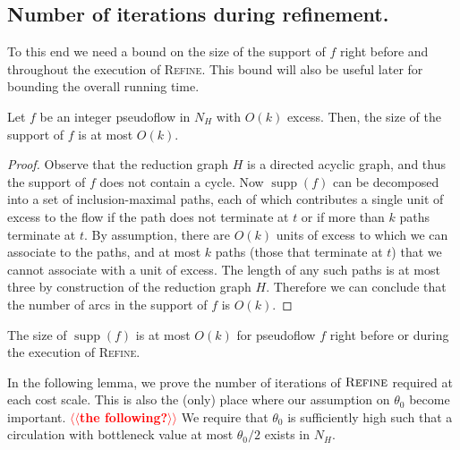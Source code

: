 \documentclass[a4paper,UKenglish]{socg-lipics-v2018}
\makeatletter
\def\etal{\emph{et~al.}}
\def\etal{\textit{et~al.}}
\def\supp{\operatorname{supp}}
\theoremstyle{plain}
\numberwithin{figure}{section}
\def\n@te#1{\textsf{\boldmath \textbf{$\langle\!\langle$#1$\rangle\!\rangle$}}\leavevmode}
\def\note#1{\textcolor{red}{\n@te{#1}}}
\makeatother
\begin{document}
\begin{toappendix}
\subsection{Number of iterations during refinement.}
\label{SSA:num-iterations-refine}


To this end we need a bound on the size of the support of $f$ right before and throughout the execution of \textsc{Refine}.
This bound will also be useful later for bounding the overall running time.

\begin{lemmarep}
\label{lemma:reduction_count}
Let $f$ be an integer pseudoflow in $N_H$ with $O(k)$ excess.
Then, the size of the support of $f$ is at most $O(k)$.
\end{lemmarep}

\begin{proof}
Observe that the reduction graph $H$ is a directed acyclic graph, and thus the support of $f$ does not contain a cycle.
Now $\supp(f)$ can be decomposed into a set of inclusion-maximal paths,
each of which contributes a single unit of excess to the flow if the path does not terminate at $t$ or if more than $k$ paths terminate at $t$.
By assumption, there are $O(k)$ units of excess to which we can associate to the paths, and at most $k$ paths (those that terminate at $t$) that we cannot associate with a unit of excess.
The length of any such paths is at most  three by construction of the reduction graph $H$.
Therefore we can conclude that the number of arcs in the support of $f$ is $O(k)$.
\end{proof}

\begin{corollary}
\label{corollary:support_size_during}
The size of $\supp(f)$ is at most $O(k)$ for pseudoflow $f$ right before or during the execution of \textsc{Refine}.
\end{corollary}

\end{toappendix}

In the following lemma, we prove the number of iterations of $\textsc{Refine}$
required at each cost scale.
This is also the (only) place where our assumption on $\theta_0$
become important. \note{the following?}
We require that $\theta_0$ is sufficiently high such that a
circulation with bottleneck value at most $\theta_0/2$ exists in $N_H$.
\end{document}
